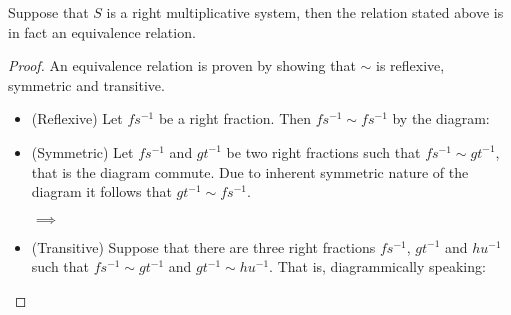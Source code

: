     \begin{prop}
        Suppose that $S$ is a right multiplicative system, then the relation stated above is in fact an equivalence relation.
    \end{prop}

    \begin{proof}
        An equivalence relation is proven by showing that $\sim$ is reflexive, symmetric and transitive.
        \begin{itemize}
            \item (Reflexive) Let $fs^{-1}$ be a right fraction. Then $fs^{-1}\sim fs^{-1}$ by the diagram:
            \begin{center}
            \end{center}
            \item (Symmetric) Let $fs^{-1}$ and $gt^{-1}$ be two right fractions such that $fs^{-1}\sim gt^{-1}$, that is the diagram commute. Due to inherent symmetric nature of the diagram it follows that $gt^{-1}\sim fs^{-1}$.
            \begin{center}
                $\implies$
            \end{center}
            \item (Transitive) Suppose that there are three right fractions $fs^{-1}$, $gt^{-1}$ and $hu^{-1}$ such that $fs^{-1}\sim gt^{-1}$ and $gt^{-1}\sim hu^{-1}$. That is, diagrammically speaking:

\end{itemize}
\end{proof}
